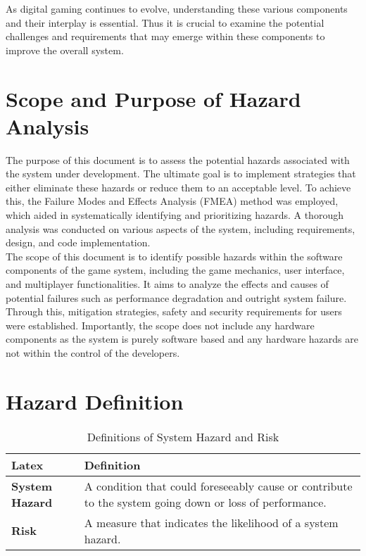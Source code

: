 \documentclass{article}
\begin{document}
As digital gaming continues to evolve, understanding these various components and their interplay is essential. Thus it is crucial to examine the potential challenges and requirements that may emerge within these components to improve the overall system.

\section{Scope and Purpose of Hazard Analysis}

The purpose of this document is to assess the potential hazards associated with the system under development. The ultimate goal is to implement strategies that either eliminate these hazards or reduce them to an acceptable level. To achieve this, the Failure Modes and Effects Analysis (FMEA) method was employed, which aided in systematically identifying and prioritizing hazards. A thorough analysis was conducted on various aspects of the system, including requirements, design, and code implementation.\\

The scope of this document is to identify possible hazards within the software components of the game system, including the game mechanics, user interface, and multiplayer functionalities. It aims to analyze the effects and causes of potential failures such as performance degradation and outright system failure. Through this, mitigation strategies, safety and security requirements for users were established. Importantly, the scope does not include any hardware components as the system is purely software based and any hardware hazards are not within the control of the developers.

\section{Hazard Definition}

\begin{table}[H]
    \centering
    \begin{tabular}{|l|p{10cm}|}
    \hline
    \textbf{Latex} & \textbf{Definition} \\ \hline
    \textbf{System Hazard} & A condition that could foreseeably cause or contribute to the system going down or loss of performance. \\ \hline
    \textbf{Risk} & A measure that indicates the likelihood of a system hazard. \\ \hline
    \end{tabular}
    \caption{Definitions of System Hazard and Risk}
\end{table}
\end{document}
